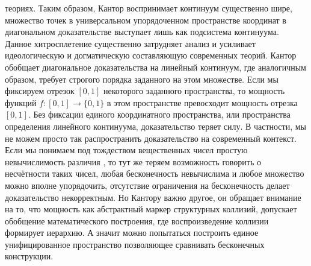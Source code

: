 \documentclass[12pt]{article}
\begin{document}
теориях. Таким образом, Кантор воспринимает континуум существенно шире, множество точек в универсальном упорядоченном пространстве координат в диагональном доказательстве выступает лишь как подсистема континуума. Данное хитросплетение существенно затрудняет анализ и усиливает идеологическую и догматическую составляющую современных теорий. Кантор обобщает диагональное доказательства на линейный континуум, где аналогичным образом, требует строгого порядка заданного на этом множестве. Если мы фиксируем отрезок $[0, 1]$ некоторого заданного пространства, то мощность функций $f : [0, 1] \to \{ 0, 1 \}$ в этом пространстве превосходит мощность отрезка $[0, 1]$. Без фиксации единого координатного пространства, или пространства определения линейного континуума, доказательство теряет силу. В частности, мы не можем просто так распространить доказательство на современный контекст. Если мы понимаем под тождеством вещественных чисел простую невычислимость различия \cite{compare-undecidable}, то тут же теряем возможность говорить о несчётности таких чисел, любая бесконечность невычислима и любое множество можно вполне упорядочить, отсутствие ограничения на бесконечность делает доказательство некорректным. Но Кантору важно другое, он обращает внимание на то, что мощность как абстрактный маркер структурных коллизий, допускает обобщение математического построения, где воспроизведение коллизии формирует иерархию. А значит можно попытаться построить единое унифицированное пространство позволяющее сравнивать бесконечных конструкции. 
\end{document}
